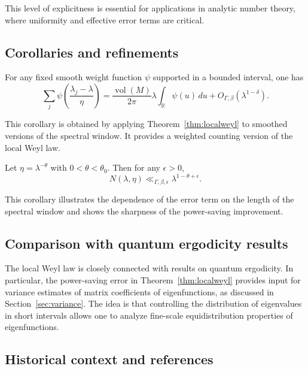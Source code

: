 This level of explicitness is essential for applications in analytic number theory, where uniformity and effective error terms are critical.

\subsection{Corollaries and refinements}

\begin{corollary}\label{cor:density}
For any fixed smooth weight function $\psi$ supported in a bounded interval, one has
\[
\sum_j \psi\!\left( \frac{\lambda_j - \lambda}{\eta} \right)
= \frac{\operatorname{vol}(M)}{2\pi} \lambda \int_{\mathbb{R}} \psi(u)\,du
+ O_{\Gamma,\beta}\!\left( \lambda^{1-\delta} \right).
\]
\end{corollary}

This corollary is obtained by applying Theorem~\ref{thm:localweyl} to smoothed versions of the spectral window. It provides a weighted counting version of the local Weyl law.

\begin{corollary}\label{cor:averages}
Let $\eta = \lambda^{-\theta}$ with $0 < \theta < \theta_0$. Then for any $\epsilon > 0$,
\[
N(\lambda, \eta) \ll_{\Gamma,\beta,\epsilon} \lambda^{1-\theta+\epsilon}.
\]
\end{corollary}

This corollary illustrates the dependence of the error term on the length of the spectral window and shows the sharpness of the power-saving improvement.

\subsection{Comparison with quantum ergodicity results}

The local Weyl law is closely connected with results on quantum ergodicity. In particular, the power-saving error in Theorem~\ref{thm:localweyl} provides input for variance estimates of matrix coefficients of eigenfunctions, as discussed in Section~\ref{sec:variance}. The idea is that controlling the distribution of eigenvalues in short intervals allows one to analyze fine-scale equidistribution properties of eigenfunctions.

\subsection{Historical context and references}

